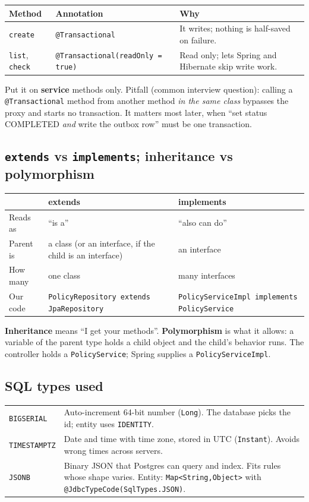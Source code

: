 \documentclass[11pt,a4paper]{article}
\newcommand{\code}[1]{\texttt{\small #1}}
\begin{document}
\begin{tabular}{@{}p{2.4cm}p{5.2cm}p{7.4cm}@{}}
\toprule
\textbf{Method} & \textbf{Annotation} & \textbf{Why} \\
\midrule
\code{create} & \code{@Transactional} & It writes; nothing is half-saved on failure. \\
\code{list}, \code{check} & \code{@Transactional(readOnly = true)} & Read only; lets Spring and Hibernate skip write work. \\
\bottomrule
\end{tabular}

Put it on \textbf{service} methods only. Pitfall (common interview question): calling a
\code{@Transactional} method from another method \emph{in the same class} bypasses the proxy
and starts no transaction. It matters most later, when ``set status COMPLETED \emph{and} write
the outbox row'' must be one transaction.

\subsection{\texttt{extends} vs \texttt{implements}; inheritance vs polymorphism}
\begin{tabular}{@{}p{2.4cm}p{6.1cm}p{6.5cm}@{}}
\toprule
 & \textbf{extends} & \textbf{implements} \\
\midrule
Reads as & ``is a'' & ``also can do'' \\
Parent is & a class (or an interface, if the child is an interface) & an interface \\
How many & one class & many interfaces \\
Our code & \code{PolicyRepository extends JpaRepository} & \code{PolicyServiceImpl implements PolicyService} \\
\bottomrule
\end{tabular}

\textbf{Inheritance} means ``I get your methods''. \textbf{Polymorphism} is what it allows:
a variable of the parent type holds a child object and the child's behavior runs. The
controller holds a \code{PolicyService}; Spring supplies a \code{PolicyServiceImpl}.

\subsection{SQL types used}
\begin{tabular}{@{}p{3.2cm}p{11.8cm}@{}}
\toprule
\code{BIGSERIAL} & Auto-increment 64-bit number (\code{Long}). The database picks the id; entity uses \code{IDENTITY}. \\
\code{TIMESTAMPTZ} & Date and time with time zone, stored in UTC (\code{Instant}). Avoids wrong times across servers. \\
\code{JSONB} & Binary JSON that Postgres can query and index. Fits rules whose shape varies. Entity: \code{Map<String,Object>} with \code{@JdbcTypeCode(SqlTypes.JSON)}. \\
\bottomrule
\end{tabular}
\end{document}
